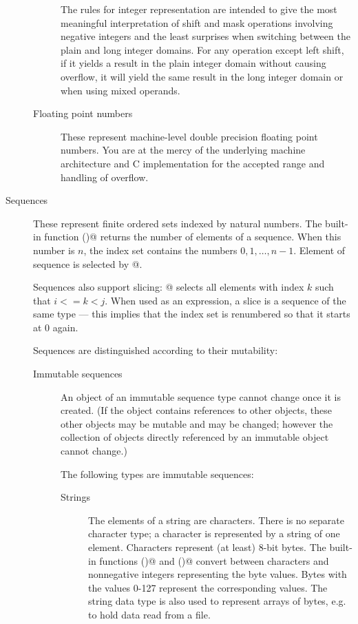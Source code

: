 \begin{description}
\begin{description}
The rules for integer representation are intended to give the most
meaningful interpretation of shift and mask operations involving
negative integers and the least surprises when switching between the
plain and long integer domains.  For any operation except left shift,
if it yields a result in the plain integer domain without causing
overflow, it will yield the same result in the long integer domain or
when using mixed operands.

\item[Floating point numbers]
These represent machine-level double precision floating point numbers.  
You are at the mercy of the underlying machine architecture and
C implementation for the accepted range and handling of overflow.

\end{description} %

\item[Sequences]
These represent finite ordered sets indexed by natural numbers.
The built-in function \verb@len()@ returns the number of elements
of a sequence.  When this number is $n$, the index set contains
the numbers $0, 1, \ldots, n-1$.  Element \verb@i@ of sequence
\verb@a@ is selected by \verb@a[i]@.

Sequences also support slicing: \verb@a[i:j]@ selects all elements
with index $k$ such that $i <= k < j$.  When used as an expression,
a slice is a sequence of the same type --- this implies that the
index set is renumbered so that it starts at 0 again.

Sequences are distinguished according to their mutability:

\begin{description}
%
\item[Immutable sequences]
An object of an immutable sequence type cannot change once it is
created.  (If the object contains references to other objects,
these other objects may be mutable and may be changed; however
the collection of objects directly referenced by an immutable object
cannot change.)

The following types are immutable sequences:

\begin{description}

\item[Strings]
The elements of a string are characters.  There is no separate
character type; a character is represented by a string of one element.
Characters represent (at least) 8-bit bytes.  The built-in
functions \verb@chr()@ and \verb@ord()@ convert between characters
and nonnegative integers representing the byte values.
Bytes with the values 0-127 represent the corresponding \ASCII{} values.
The string data type is also used to represent arrays of bytes, e.g.
to hold data read from a file.


\end{description}
\end{description}
\end{description}
